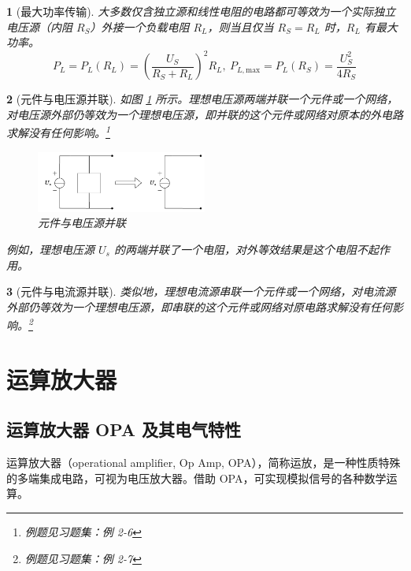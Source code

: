 \documentclass[UTF8]{report}
\theoremstyle{MyLineTheoremStyle} %
\theoremstyle{MyBlockTheoremStyle} %
\theoremstyle{MySubsubsectionStyle} %
\newtheorem{definition}{}
\begin{document}
\begin{definition}[最大功率传输]
大多数仅含独立源和线性电阻的电路都可等效为一个实际独立电压源（内阻 $R_S$）外接一个负载电阻 $R_L$，则当且仅当 $R_S = R_L$ 时，$R_L$ 有最大功率。
\begin{equation}
P_L = P_L(R_L) =  \left(\frac{U_S}{R_S + R_L}\right)^2R_L, \ P_{L,\mathrm{max}} = P_L(R_S) = \frac{U_S^2}{4R_S}
\end{equation}
\end{definition}



\begin{definition}[元件与电压源并联]
如图 \ref{元件与电压源并联}  所示。理想电压源两端并联一个元件或一个网络，对电压源外部仍等效为一个理想电压源，即并联的这个元件或网络对原本的外电路求解没有任何影响。\footnote{例题见习题集：例 2-6}

\begin{figure}[H]\centering
\includegraphics[width=0.5\textwidth]{assets/1,2/电阻与电源并联.drawio.pdf}
\caption{元件与电压源并联}\label{元件与电压源并联}
\end{figure}

例如，理想电压源 $U_s$ 的两端并联了一个电阻，对外等效结果是这个电阻不起作用。
\end{definition}

\begin{definition}[元件与电流源并联]
    类似地，理想电流源串联一个元件或一个网络，对电流源外部仍等效为一个理想电压源，即串联的这个元件或网络对原电路求解没有任何影响。\footnote{例题见习题集：例 2-7}
\end{definition}

\section{运算放大器}

\subsection{运算放大器 OPA 及其电气特性}


运算放大器（operational amplifier, Op Amp, OPA），简称运放，是一种性质特殊的多端集成电路，可视为电压放大器。借助 OPA，可实现模拟信号的各种数学运算。
\end{document}
